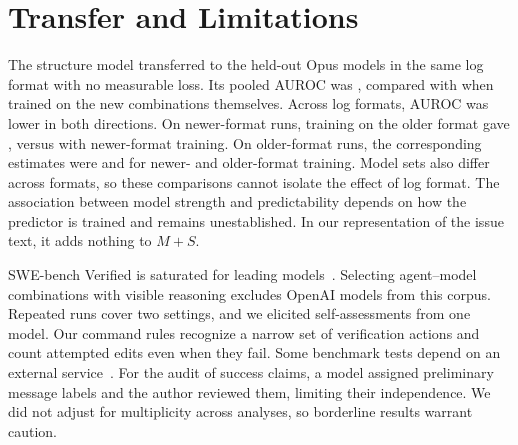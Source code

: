\section{Transfer and Limitations}
\label{sec:transfer}

The structure model transferred to the held-out Opus models in the same log format with no measurable loss. Its pooled AUROC was , compared with  when trained on the new combinations themselves. Across log formats, AUROC was lower in both directions. On newer-format runs, training on the older format gave , versus  with newer-format training. On older-format runs, the corresponding estimates were  and  for newer- and older-format training. Model sets also differ across formats, so these comparisons cannot isolate the effect of log format. The association between model strength and predictability depends on how the predictor is trained and remains unestablished. In our representation of the issue text, it adds nothing to $M+S$.

SWE-bench Verified is saturated for leading models~\cite{valsai2026swebench}. Selecting agent--model combinations with visible reasoning excludes OpenAI models from this corpus. Repeated runs cover two settings, and we elicited self-assessments from one model. Our command rules recognize a narrow set of verification actions and count attempted edits even when they fail. Some benchmark tests depend on an external service~\cite{swebench2025issue484}. For the audit of success claims, a model assigned preliminary message labels and the author reviewed them, limiting their independence. We did not adjust for multiplicity across analyses, so borderline results warrant caution.

